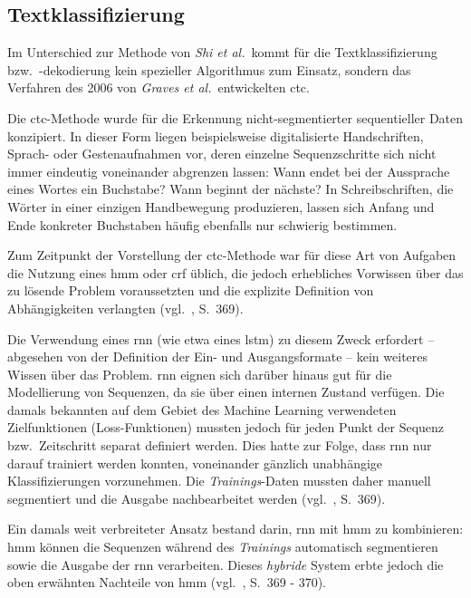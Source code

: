 \subsection{Textklassifizierung}
\label{daten:textklassifizierung}

Im Unterschied zur Methode von \textit{Shi et al.}\ kommt für die Textklassifizierung bzw.\ -dekodierung kein spezieller
Algorithmus zum Einsatz, sondern das Verfahren des 2006 von \textit{Graves et al.}\ entwickelten \gls{ctc}.

Die \gls{ctc}-Methode wurde für die Erkennung nicht-segmentierter sequentieller Daten konzipiert. In dieser Form liegen
beispielsweise digitalisierte Handschriften, Sprach- oder Gestenaufnahmen vor, deren einzelne Sequenzschritte sich nicht
immer eindeutig voneinander abgrenzen lassen: Wann endet bei der Aussprache eines Wortes ein Buchstabe? Wann beginnt der
nächste? In Schreibschriften, die Wörter in einer einzigen Handbewegung produzieren, lassen sich Anfang und Ende
konkreter Buchstaben häufig ebenfalls nur schwierig bestimmen.

Zum Zeitpunkt der Vorstellung der \gls{ctc}-Methode war für diese Art von Aufgaben die Nutzung eines \gls{hmm} oder
\gls{crf} üblich, die jedoch erhebliches Vorwissen über das zu lösende Problem voraussetzten und die explizite
Definition von Abhängigkeiten verlangten (vgl.~\cite{graves2006}, S.~369).

Die Verwendung eines \gls{rnn} (wie etwa eines \gls{lstm}) zu diesem Zweck erfordert -- abgesehen von der Definition
der Ein- und Ausgangsformate -- kein weiteres Wissen über das Problem. \gls{rnn} eignen sich darüber hinaus gut für die
Modellierung von Sequenzen, da sie über einen internen Zustand verfügen. Die damals bekannten auf dem Gebiet des Machine
Learning verwendeten Zielfunktionen (Loss-Funktionen) mussten jedoch für jeden Punkt der Sequenz bzw.\ Zeitschritt
separat definiert werden. Dies hatte zur Folge, dass \gls{rnn} nur darauf trainiert werden konnten, voneinander gänzlich
unabhängige Klassifizierungen vorzunehmen. Die \textit{Trainings}-Daten mussten daher manuell segmentiert und die 
Ausgabe nachbearbeitet werden (vgl.~\cite{graves2006}, S.~369). 

Ein damals weit verbreiteter Ansatz bestand darin, \gls{rnn} mit \gls{hmm} zu kombinieren: \gls{hmm} können die
Sequenzen während des \textit{Trainings} automatisch segmentieren sowie die Ausgabe der \gls{rnn} verarbeiten. Dieses
\textit{hybride} System erbte jedoch die oben erwähnten Nachteile von \gls{hmm} (vgl.~\cite{graves2006}, S.~369 - 370).

